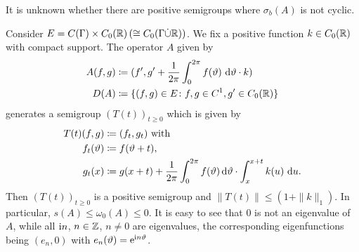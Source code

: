 It is unknown whether there are positive semigroups where $\sigma_{b}(A)$ is not cyclic.
\begin{example}\label{ex:b3-2.13}
	Consider $E = C(\Gamma) \times C_{0}(\mathbb{R}) \, (\cong C_{0}(\Gamma\dot{\cup}\mathbb{R}))$.
	We fix a positive function $k \in C_{0}(\mathbb{R})$ with compact support.
	The operator $A$ given by
	\begin{equation}\label{eq:b3-2.20}
		\begin{aligned}
		A(f,g) &\coloneq (f',g' + \frac{1}{2\pi}\int_{0}^{2\pi} f(\theta) \, \diff{\theta}\cdot k) \\
		D(A) &\coloneq \{(f,g) \in E \colon f,g \in C^{1}, g' \in C_{0}(\R)\}
		\end{aligned}
	\end{equation}
	generates a semigroup $(T(t))_{t \geq 0}$ which is given by
	\begin{equation}\label{eq:b3-2.21}
		\begin{aligned}
			T(t)(f,g) &\coloneq (f_{t},g_{t}) \text{ with }\\
		   f_{t}(\theta) &\coloneq f(\theta+t), \\
			g_{t}(x) &\coloneq g(x+t) + \frac{1}{2\pi}\int_{0}^{2\pi} f(\theta) \diff{\theta}\cdot\int_{x}^{x+t} k(u) \, \du .
		\end{aligned} 
	\end{equation}
	Then $(T(t))_{t \geq 0}$ is a positive semigroup and $\|T(t)\| \leq (1 + \|k\|_{1})$.
	In particular, $s(A) \leq \omega_{0}(A) \leq 0$.
	It is easy to see that $0$ is not an eigenvalue of\/ $A$, while all $\mathrm{i} n$, $n \in \mathbb{Z}$, $n \neq 0$ are eigenvalues, the corresponding eigenfunctions being $(e_{n},0)$ with $e_{n}(\theta) = \eu^{\im n\theta}$.
\end{example}
